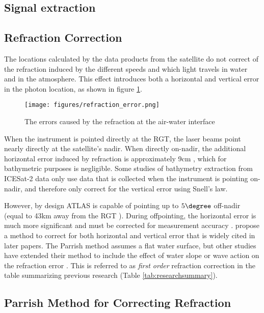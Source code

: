 \subsection{Signal extraction}

\subsection{Refraction Correction}
The locations calculated by the data products from the satellite do not correct of the refraction induced by the different speeds and which light travels in water and in the atmosphere. This effect introduces both a horizontal and vertical error in the photon location, as shown in figure \ref{refract-image}.

\begin{figure}[ht]
      \centering
      \texttt{[image: figures/refraction\_error.png]}
      \caption{The errors caused by the refraction at the air-water interface}
      \label{refract-image}
\end{figure}

When the instrument is pointed directly at the RGT, the laser beams point nearly directly at the satellite's nadir. When directly on-nadir, the additional horizontal error induced by refraction is approximately 9cm \parencite{Parrish2019}, which for bathymetric purposes is negligible. Some studies of bathymetry extraction from ICESat-2 data only use data that is collected when the instrument is pointing on-nadir, and therefore only correct for the vertical error using Snell's law.

However, by design ATLAS is capable of pointing up to $5 \degree$ off-nadir (equal to 43km away from the RGT \parencite{Magruder2021}). During offpointing, the horizontal error is much more significant and must be corrected for measurement accuracy \parencite{Parrish2019}. \citeauthor{Parrish2019} propose a method to correct for both horizontal and vertical error that is widely cited in later papers. The Parrish method assumes a flat water surface, but other studies have extended their method to include the effect of water slope or wave action on the refraction error \parencite{Ma2020,Zhang2022}.  This is referred to as \emph{first order} refraction correction in the table summarizing previous research (Table \ref{tab:researchsummary}).

\subsection{Parrish Method for Correcting Refraction}


